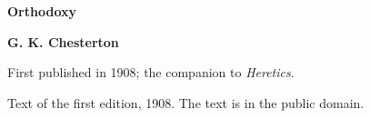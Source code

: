 \documentclass[11pt,letterpaper]{article}
\begin{document}
\color{ink}

\begin{titlepage}
\centering
\vspace*{4em}
{\LARGE\bfseries\color{heading} Orthodoxy\par}
\vspace{2em}
{\Large\bfseries\color{heading} G. K. Chesterton\par}
\vspace{2.5em}
{\itshape\color{subhead}\parbox{0.8\linewidth}{\centering First published in 1908; the companion to \emph{Heretics}.\par}}
\vfill
{\small Text of the first edition, 1908. The text is in the public domain.\par}
\vspace{2em}
\end{titlepage}

\tableofcontents


\end{document}
